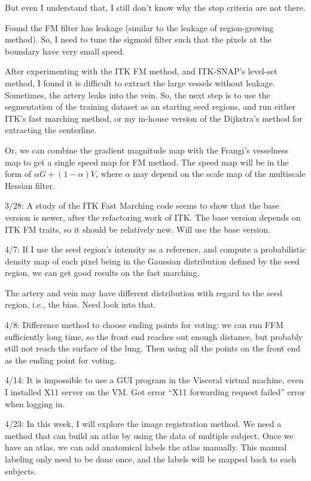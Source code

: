 \documentclass[12pt]{article}
\begin{document}
But even I understand that, I still don't know why the stop criteria are not
there.

Found the FM filter has leakage (similar to the leakage of region-growing
method). So, I need to tune the sigmoid filter such that the pixels at the
boundary have very small speed. 

After experimenting with the ITK FM method, and ITK-SNAP's level-set method, I
found it is difficult to extract the large vessels without leakage. Sometimes,
the artery leaks into the vein. So, the next step is to use the segmentation
of the training dataset as an starting seed regions, and run either ITK's fast
marching method, or my in-house version of the Dijkstra's method for
extracting the centerline. 

Or, we can combine the gradient magnitude map with the Frangi's vesselness map
to get a single speed map for FM method. The speed map will be in the form of
$\alpha G + (1-\alpha) V$, where $\alpha$ may depend on the scale map of the
multiscale Hessian filter.

3/28: A study of the ITK Fast Marching code seems to show that the base
version is newer, after the refactoring work of ITK. The base version depends
on ITK FM traits, so it should be relatively new. Will use the base version.

4/7: If I use the seed region's intensity as a reference, and compute a
probabilistic density map of each pixel being in the Gaussian distribution
defined by the seed region, we can get good results on the fast marching. 

The artery and vein may have different distribution with regard to the seed
region, i.e., the bias. Need look into that. 

4/8: Difference method to choose ending points for voting: we can run FFM
sufficiently long time, so the front end reaches out enough distance, but
probably still not reach the surface of the lung. Then using all the points on
the front end as the ending point for voting. 

4/14: It is impossible to use a GUI program in the Visceral virtual machine,
even I installed X11 server on the VM. Got error ``X11 forwarding request
failed'' error when logging in.

4/23: In this week, I will explore the image registration method. We need a
method that can build an atlas by using the data of multiple subject. Once we
have an atlas, we can add anatomical labels the atlas manually. This manual
labeling only need to be done once, and the labels will be mapped back to each
subjects.
\end{document}
